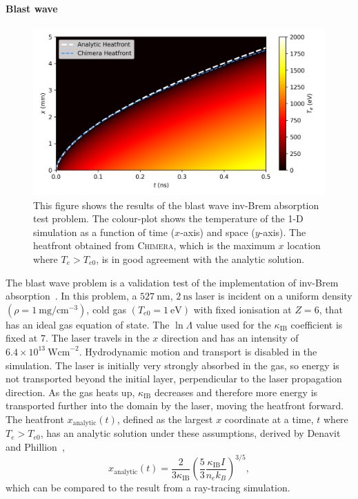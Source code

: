 \paragraph*{Blast wave}

\begin{figure}[t!]
    \includegraphics[width=0.75\linewidth]{Numerics/Images/blastwave.png}
    \centering
    \caption{This figure shows the results of the blast wave \ac{inv-Brem} absorption test problem.
    The colour-plot shows the temperature of the 1-D simulation as a function of time ($x$-axis) and space ($y$-axis).
    The heatfront obtained from \textsc{Chimera}, which is the maximum $x$ location where $T_e>T_{e0}$, is in good agreement with the analytic solution.}%
    \label{fig:SOLAS_blastwave}
\end{figure}

The blast wave problem is a validation test of the implementation of \ac{inv-Brem} absorption~\cite{denavit_laser_1994,haines_coupling_2020}.
In this problem, a $527\ \text{nm}$, $2\ \text{ns}$ laser is incident on a uniform density $(\rho = 1\ \text{mg}/\text{cm}^{-3})$, cold gas $(T_{e0} = 1\ \text{eV})$ with fixed ionisation at $Z=6$, that has an ideal gas equation of state.
The $\ln{\Lambda}$ value used for the $\kappa_{\text{IB}}$ coefficient is fixed at 7.
The laser travels in the $x$ direction and has an intensity of $6.4\times 10^{13}\ \text{Wcm}^{-2}$.
Hydrodynamic motion and transport is disabled in the simulation.
The laser is initially very strongly absorbed in the gas, so energy is not transported beyond the initial layer, perpendicular to the laser propagation direction.
As the gas heats up, $\kappa_{\text{IB}}$ decreases and therefore more energy is transported further into the domain by the laser, moving the heatfront forward.
The heatfront $x_{\text{analytic}}(t)$, defined as the largest $x$ coordinate at a time, $t$ where $T_e>T_{e0}$, has an analytic solution under these assumptions, derived by Denavit and Phillion~\cite{denavit_laser_1994},
\begin{equation}
    x_{\text{analytic}}(t) = \frac{2}{3\kappa_{\text{IB}}}\left( \frac{5}{3} \frac{\kappa_{\text{IB}}I}{n_e k_B} \right)^{3/5},
\end{equation}
which can be compared to the result from a ray-tracing simulation.

